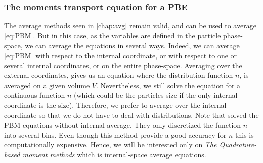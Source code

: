 \subsubsection*{The moments transport equation for a PBE}
The average methods seen in \ref{chap:avg} remain valid, and can be used to average \ref{eq:PBM}.
But in this case, as the variables are defined in the particle phase-space, we can average the equations in several ways.
Indeed, we can average \ref{eq:PBM} with respect to the internal coordinate, or with respect to one or several internal coordinates, or on the entire phase-space. 
Averaging over the external coordinates, gives us an equation where the distribution function $n$, is averaged on a given volume $V$.
Nevertheless, we still solve the equation for a continuous function $n$ (which could be the particles size if the only internal coordinate is the size). 
Therefore, we prefer to average over the internal coordinate so that we do not have to deal with distributions. 
Note that \citet{salehi2017population} solved the PBM equations without internal-average.
They only discretized the function $n$ into several bins. 
Even though this method provide a good accuracy for $n$ this is computationally expensive.
Hence, we will be interested only on \textit{The Quadrature-based moment methods} which is internal-space average equations.

